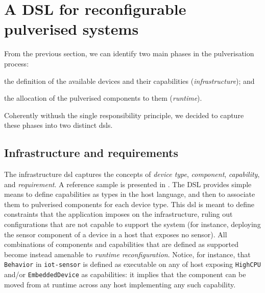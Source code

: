 \documentclass[conference]{IEEEtran}
\begin{document}
\section{A DSL for reconfigurable pulverised systems}\label{sec:contribution}

From the previous section,
we can identify two main phases in the pulverisation process:
\begin{enumerate*}[label=\it{(\roman*)}]
  \item the definition of the available devices and their capabilities (\emph{infrastructure}); and
  \item the allocation of the pulverised components to them (\emph{runtime}).
\end{enumerate*}
%
Coherently withush the single responsibility principle,
we decided to capture these phases into two distinct \acp{dsl}.

\subsection{Infrastructure and requirements}

The infrastructure \ac{dsl} captures the concepts of
\emph{device type}, \emph{component}, \emph{capability}, and \emph{requirement}.
%
A reference sample is presented in .
%
The DSL provides simple means to define capabilities as types in the host language,
and then to associate them to pulverised components for each device type.
%
This \ac{dsl} is meant to define constraints that the application imposes on the infrastructure,
ruling out configurations that are not capable to support the system
(for instance, deploying the sensor component of a device in a host that exposes no sensor).
%
All combinations of components and capabilities that are defined as supported become instead amenable to
\emph{runtime reconfiguration}.
%
Notice, for instance, that \texttt{Behavior} in \texttt{iot-sensor} is defined as executable on any of host exposing
\texttt{HighCPU} and/or \texttt{EmbeddedDevice} as capabilities:
it implies that the component can be moved from at runtime across any host implementing any such capability.


\end{document}
